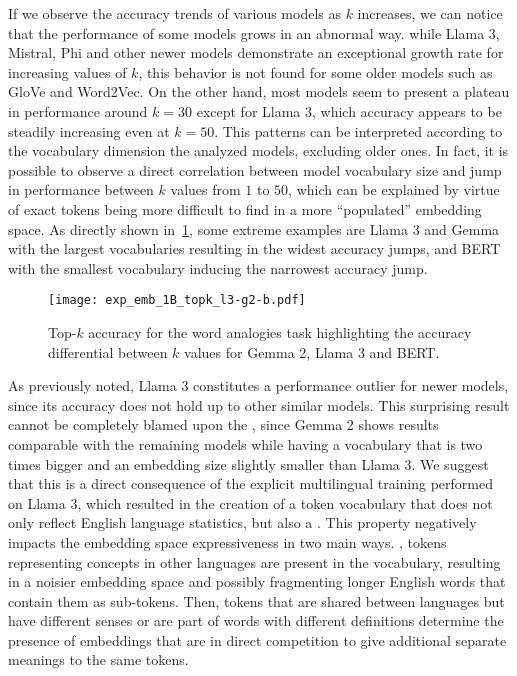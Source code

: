 If we observe the accuracy trends of various models as $k$ increases, we can notice that the performance of some models grows in an abnormal way.
 while Llama 3, Mistral, Phi and other newer models demonstrate an exceptional growth rate for increasing values of $k$, this behavior is not found for some older models such as GloVe and Word2Vec.
On the other hand, most models seem to present a plateau in performance around $k = 30$ except for Llama 3, which accuracy appears to be steadily increasing even at $k = 50$.
This patterns can be interpreted according to the vocabulary dimension the analyzed models, excluding older ones.
In fact, it is possible to observe a direct correlation between model vocabulary size and jump in performance between $k$ values from $1$ to $50$, which can be explained by virtue of exact tokens being more difficult to find in a more ``populated'' embedding space.
As directly shown in~\cref{fig:exp_emb_1_B}, some extreme examples are Llama 3 and Gemma with the largest vocabularies resulting in the widest accuracy jumps, and BERT with the smallest vocabulary inducing the narrowest accuracy jump.

\begin{figure}[t!]
    \centering
    \texttt{[image: exp\_emb\_1B\_topk\_l3-g2-b.pdf]}
    \caption[Top-$k$ accuracy for the word analogies task highlighting the accuracy differential between $k$ values for various models.]{Top-$k$ accuracy for the word analogies task highlighting the accuracy differential between $k$ values for Gemma 2, Llama 3 and BERT.}
    \label{fig:exp_emb_1_B}
\end{figure}

As previously noted, Llama 3 constitutes a performance outlier for newer models, since its accuracy does not hold up to other similar models.
This surprising result cannot be completely blamed upon the , since Gemma 2 shows results comparable with the remaining models while having a vocabulary that is two times bigger and an embedding size slightly smaller than Llama 3.
We suggest that this is a direct consequence of the explicit multilingual training performed on Llama 3, which resulted in the creation of a token vocabulary that does not only reflect English language statistics, but also a .
This property negatively impacts the embedding space expressiveness in two main ways.
, tokens representing concepts in other languages are present in the vocabulary, resulting in a noisier embedding space and possibly fragmenting longer English words that contain them as sub-tokens.
Then, tokens that are shared between languages but have different senses or are part of words with different definitions determine the presence of embeddings that are in direct competition to give additional separate meanings to the same tokens.

